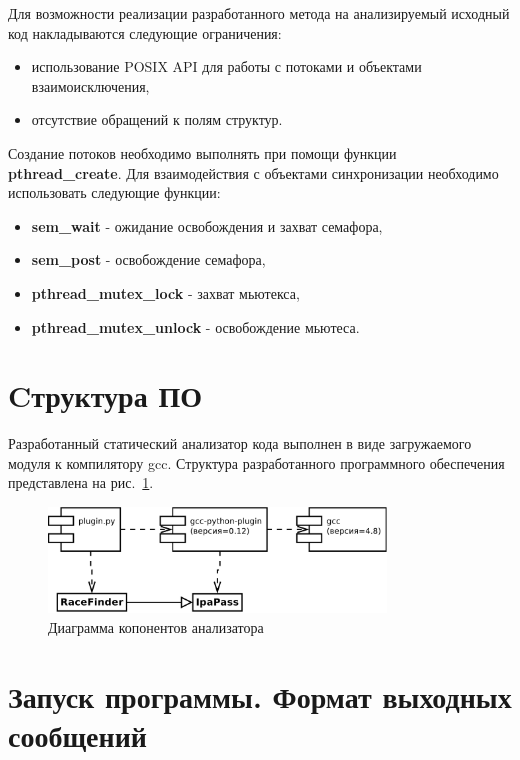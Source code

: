 Для возможности реализации разработанного метода на анализируемый исходный код накладываются следующие ограничения:
\begin{itemize}
  \item использование POSIX API для работы с потоками и объектами взаимоисключения,
  \item отсутствие обращений к полям структур.
\end{itemize}

Создание потоков необходимо выполнять при помощи функции \textbf{pthread\_create}. Для взаимодействия с объектами синхронизации необходимо использовать следующие функции:
\begin{itemize}
  \item \textbf{sem\_wait} - ожидание освобождения и захват семафора,
  \item \textbf{sem\_post} - освобождение семафора,
  \item \textbf{pthread\_mutex\_lock} - захват мьютекса,
  \item \textbf{pthread\_mutex\_unlock} - освобождение мьютеса.
\end{itemize}


\section{Cтруктура ПО}

Разработанный статический анализатор кода выполнен в виде загружаемого модуля к компилятору gcc. Структура разработанного программного обеспечения представлена на рис.~\ref{fig:components}.

\begin{figure}
  \centering
  \includegraphics[width=0.8\textwidth]{inc/dia/components}
  \caption{Диаграмма копонентов анализатора}
  \label{fig:components}
\end{figure}

\section{Запуск программы. Формат выходных сообщений}

